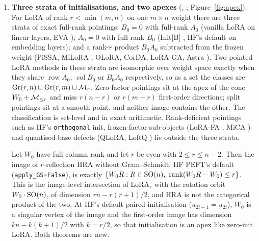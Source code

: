 \begin{enumerate}[label=\textbf{\arabic*.},leftmargin=1.9em]
\item \textbf{Three strata of initialisations, and two apexes} (, ; Figure~\ref{fig:apex}). For LoRA of rank $r<\min(m,n)$ on one $m\times n$ weight there are three strata of exact full-rank pointings: $B_0=0$ with full-rank $A_0$ (vanilla LoRA on linear layers, EVA \citep{paischer2024parameter}); $A_0=0$ with full-rank $B_0$ (Init[B] \citep{hayou2024impact}, HF's default on embedding layers); and a rank-$r$ product $B_0A_0$ subtracted from the frozen weight (PiSSA, MiLoRA \citep{wang2024milora}, OLoRA, CorDA, LoRA-GA, Astra \citep{liu2026astra}). Two pointed LoRA methods in these strata are isomorphic over weight space exactly when they share $\operatorname{row}A_0$, $\operatorname{col}B_0$ or $B_0A_0$ respectively, so as a set the classes are $\operatorname{Gr}(r,n)\sqcup\operatorname{Gr}(r,m)\sqcup\mathcal{M}_r$. Zero-factor pointings sit at the apex of the cone $W_0+\mathcal{M}_{\le r}$ and miss $r(n-r)$ or $r(m-r)$ first-order directions; split pointings sit at a smooth point, and neither image contains the other. The classification is set-level and in exact arithmetic. Rank-deficient pointings such as HF's \texttt{orthogonal} init, frozen-factor sub-objects (LoRA-FA \citep{zhang2023lora}, MiCA \citep{rudiger2026mica}) and quantised-base defects (QLoRA, LoftQ \citep{li2023loftq}) lie outside the three strata.

Let $W_0$ have full column rank and let $r$ be even with $2\le r\le n-2$. Then the image of $r$-reflection HRA \citep{yuan2024bridging} without Gram--Schmidt, HF PEFT's default (\texttt{apply\_GS=False}), is exactly $\{W_0R:R\in\mathrm{SO}(n),\ \operatorname{rank}(W_0R-W_0)\le r\}$. This is the image-level intersection of $\mathrm{LoRA}_r$ with the rotation orbit $W_0\cdot\mathrm{SO}(n)$, of dimension $rn-r(r+1)/2$, and HRA is not the categorical product of the two. At HF's default paired initialisation ($u_{2i-1}=u_{2i}$), $W_0$ is a singular vertex of the image and the first-order image has dimension $kn-k(k+1)/2$ with $k=r/2$, so that initialisation is an apex like zero-init LoRA. Both theorems are new.


\end{enumerate}
